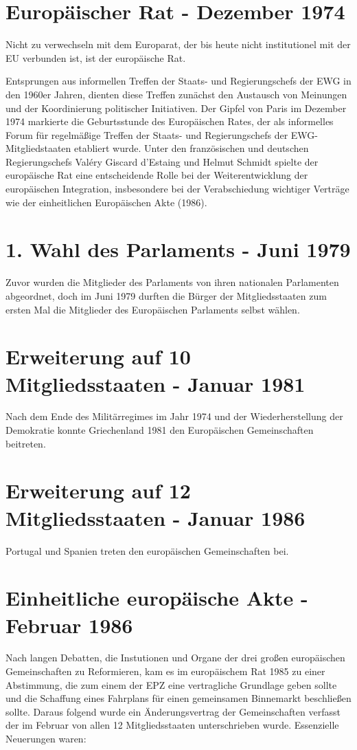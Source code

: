 \documentclass[12pt, oneside]{book} %
\begin{document}
\section{Europäischer Rat - Dezember 1974}
Nicht zu verwechseln mit dem Europarat, der bis heute nicht institutionel mit der EU verbunden ist, ist der europäische Rat. 
\par 
Entsprungen aus informellen Treffen der Staats- und Regierungschefs der EWG in den 1960er Jahren, dienten diese Treffen zunächst den Austausch von Meinungen und der Koordinierung politischer Initiativen. Der Gipfel von Paris im Dezember 1974 markierte die Geburtsstunde des Europäischen Rates, der als informelles Forum für regelmäßige Treffen der Staats- und Regierungschefs der EWG-Mitgliedstaaten etabliert wurde. Unter den französischen und deutschen Regierungschefs  Valéry Giscard d’Estaing und Helmut Schmidt spielte der europäische Rat eine entscheidende Rolle bei der Weiterentwicklung der europäischen Integration, insbesondere bei der Verabschiedung wichtiger Verträge wie der einheitlichen Europäischen Akte (1986).

\section{1. Wahl des Parlaments - Juni 1979}
Zuvor wurden die Mitglieder des Parlaments von ihren nationalen Parlamenten abgeordnet, doch im Juni 1979 durften die Bürger der Mitgliedsstaaten zum ersten Mal die Mitglieder des Europäischen Parlaments selbst wählen. 

\section{Erweiterung auf 10 Mitgliedsstaaten - Januar 1981}
Nach dem Ende des Militärregimes im Jahr 1974 und der Wiederherstellung der Demokratie konnte Griechenland 1981 den Europäischen Gemeinschaften beitreten.

\section{Erweiterung auf 12 Mitgliedsstaaten - Januar 1986}
Portugal und Spanien treten den europäischen Gemeinschaften bei.

\section{Einheitliche europäische Akte - Februar 1986}
Nach langen Debatten, die Instutionen und Organe der drei großen europäischen Gemeinschaften zu Reformieren, kam es im europäischem Rat 1985 zu einer Abstimmung, die zum einem der EPZ eine vertragliche Grundlage geben sollte und die Schaffung eines Fahrplans für einen gemeinsamen Binnemarkt beschließen sollte. Daraus folgend wurde ein Änderungsvertrag der Gemeinschaften verfasst der im Februar von allen 12 Mitgliedsstaaten unterschrieben wurde. Essenzielle Neuerungen waren:
\end{document}
